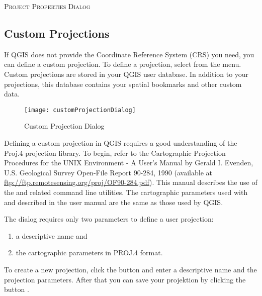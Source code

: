 \begin{Tip}
 \caption{\textsc{Project Properties Dialog}}
\end{Tip}

\subsection{Custom Projections}\label{sec:customprojections}

If QGIS does not provide the Coordinate Reference System (CRS) you need, you
can define a custom projection. To define a projection, select
 from the  menu.
Custom projections are stored in your QGIS user database. In addition to your
projections, this database contains your spatial bookmarks and other custom data. 

\begin{figure}[ht]
   \begin{center}
   \caption{Custom Projection Dialog \nixcaption}\label{fig:customprojections}\smallskip
   \texttt{[image: customProjectionDialog]}
\end{center}  
\end{figure}

Defining a custom projection in QGIS requires a good understanding of the
Proj.4 projection library. To begin, refer to the
Cartographic Projection Procedures for the UNIX Environment - A User's Manual
by Gerald I. Evenden, U.S. Geological Survey Open-File Report 90-284, 1990
(available at \url{ftp://ftp.remotesensing.org/proj/OF90-284.pdf}).
This manual describes the use of the  and related command line
utilities. The cartographic parameters used with  and described
in the user manual are the same as those used by QGIS. 

The  dialog requires
only two parameters to define a user projection: 
\begin{enumerate}
\item a descriptive name and
\item the cartographic parameters in PROJ.4 format.
\end{enumerate}
To create a new projection, click the 
 button and enter a descriptive
name and the projection parameters. 
After that you can save your projektion by clicking the button
.

